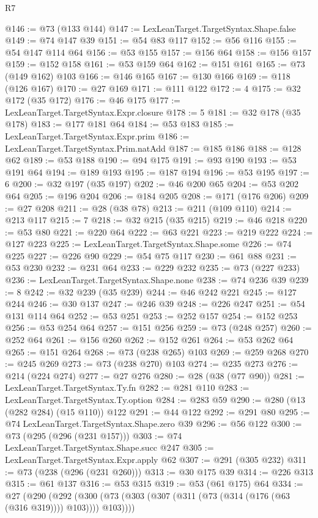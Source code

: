 \begin{lexlean}{R7}
\begin{coremodule}
{{{{{{{{{{{{{{{{{{{{{{{{{{{{{{{{{{{{{{{{{{@146 := @73 (@133 @144)
@147 := LexLeanTarget.TargetSyntax.Shape.false
@149 := @74 @147 @39
@151 := @54 @83 @117
@152 := @56 @116
@155 := @54 @147 @114 @64
@156 := @53 @155
@157 := @156 @64
@158 := @156 @157
@159 := @152 @158
@161 := @53 @159 @64
@162 := @151 @161
@165 := @73 (@149 @162) @103
@166 := @146 @165
@167 := @130 @166
@169 := @118 (@126 @167)
@170 := @27 @169
@171 := @111 @122
@172 := 4
@175 := @32 @172 (@35 @172)
@176 := @46 @175
@177 := LexLeanTarget.TargetSyntax.Expr.closure
@178 := 5
@181 := @32 @178 (@35 @178)
@183 := @177 @181 @64
@184 := @53 @183
@185 := LexLeanTarget.TargetSyntax.Expr.prim
@186 := LexLeanTarget.TargetSyntax.Prim.natAdd
@187 := @185 @186
@188 := @128 @62
@189 := @53 @188
@190 := @94 @175
@191 := @93 @190
@193 := @53 @191 @64
@194 := @189 @193
@195 := @187 @194
@196 := @53 @195
@197 := 6
@200 := @32 @197 (@35 @197)
@202 := @46 @200 @65
@204 := @53 @202 @64
@205 := @196 @204
@206 := @184 @205
@208 := @171 (@176 @206)
@209 := @27 @208
@211 := @28 (@38 @78)
@213 := @211 (@109 @110)
@214 := @213 @117
@215 := 7
@218 := @32 @215 (@35 @215)
@219 := @46 @218
@220 := @53 @80
@221 := @220 @64
@222 := @63 @221
@223 := @219 @222
@224 := @127 @223
@225 := LexLeanTarget.TargetSyntax.Shape.some
@226 := @74 @225
@227 := @226 @90
@229 := @54 @75 @117
@230 := @61 @88
@231 := @53 @230
@232 := @231 @64
@233 := @229 @232
@235 := @73 (@227 @233)
@236 := LexLeanTarget.TargetSyntax.Shape.none
@238 := @74 @236 @39
@239 := 8
@242 := @32 @239 (@35 @239)
@244 := @46 @242 @221
@245 := @127 @244
@246 := @30 @137
@247 := @246 @39
@248 := @226 @247
@251 := @54 @131 @114 @64
@252 := @53 @251
@253 := @252 @157
@254 := @152 @253
@256 := @53 @254 @64
@257 := @151 @256
@259 := @73 (@248 @257)
@260 := @252 @64
@261 := @156 @260
@262 := @152 @261
@264 := @53 @262 @64
@265 := @151 @264
@268 := @73 (@238 @265) @103
@269 := @259 @268
@270 := @245 @269
@273 := @73 (@238 @270) @103
@274 := @235 @273
@276 := @214 (@224 @274)
@277 := @27 @276
@280 := @28 (@38 (@77 @90))
@281 := LexLeanTarget.TargetSyntax.Ty.fn
@282 := @281 @110
@283 := LexLeanTarget.TargetSyntax.Ty.option
@284 := @283 @59
@290 := @280 (@13 (@282 @284) (@15 @110)) @122
@291 := @44 @122
@292 := @291 @80
@295 := @74 LexLeanTarget.TargetSyntax.Shape.zero @39
@296 := @56 @122
@300 := @73 (@295 (@296 (@231 @157)))
@303 := @74 LexLeanTarget.TargetSyntax.Shape.succ @247
@305 := LexLeanTarget.TargetSyntax.Expr.apply @62
@307 := @291 (@305 @232)
@311 := @73 (@238 (@296 (@231 @260)))
@313 := @30 @175 @39
@314 := @226 @313
@315 := @61 @137
@316 := @53 @315
@319 := @53 (@61 @175) @64
@334 := @27
    (@290 (@292 (@300 (@73 (@303 (@307 (@311 (@73 (@314 (@176 (@63 (@316 @319)))) @103)))) @103))))
}}}}}}}}}}}}}}}}}}}}}}}}}}}}}}}}}}}}}}}}}}
\end{coremodule}
\end{lexlean}
